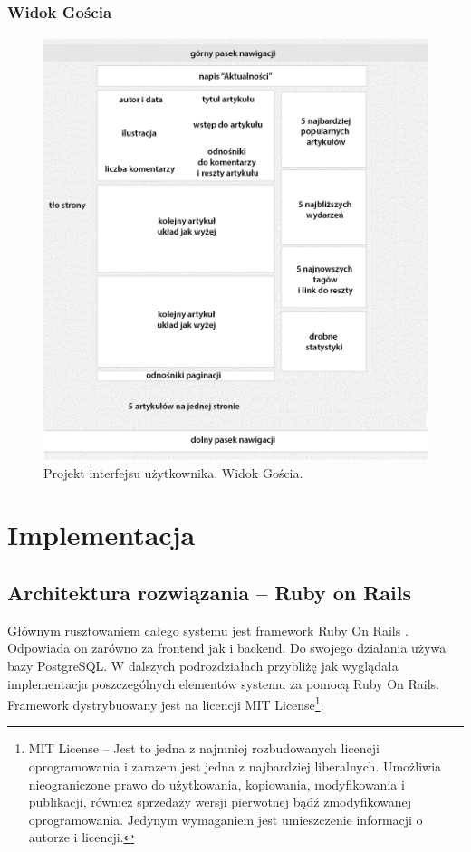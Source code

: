 \documentclass[openright]{xmgr}
\begin{document}
\newpage

\subsection{Widok Gościa}
\begin{figure}[!tbh]
\centering
\includegraphics[width=.9\linewidth]{fig/gui_guest}
\caption{Projekt interfejsu użytkownika. Widok Gościa.}
\end{figure}

\chapter{Implementacja}

\section{Architektura rozwiązania -- Ruby on Rails}
Głównym rusztowaniem całego systemu jest framework Ruby On Rails \cite{ror} \cite{enterprise} \cite{wikibook} \cite{guides}. Odpowiada on zarówno za frontend jak i backend. Do swojego działania używa bazy PostgreSQL. W dalszych podrozdziałach przybliżę jak wyglądała implementacja poszczególnych elementów systemu za pomocą Ruby On Rails. Framework dystrybuowany jest na licencji MIT License\footnote{MIT License -- Jest to jedna z najmniej rozbudowanych licencji oprogramowania i zarazem jest jedna z najbardziej liberalnych. Umożliwia nieograniczone prawo do użytkowania, kopiowania, modyfikowania i publikacji, również sprzedaży wersji pierwotnej bądź zmodyfikowanej oprogramowania. Jedynym wymaganiem jest umieszczenie informacji o autorze i licencji.}.
\end{document}
